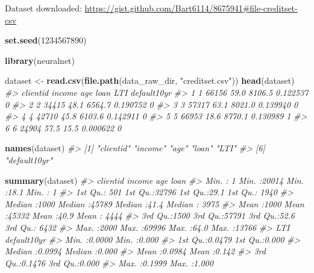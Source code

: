 \documentclass[]{book}
\newenvironment{Shaded}{\begin{snugshade}}{\end{snugshade}}
\newcommand{\CommentTok}[1]{\textcolor[rgb]{0.56,0.35,0.01}{\textit{#1}}}
\newcommand{\DecValTok}[1]{\textcolor[rgb]{0.00,0.00,0.81}{#1}}
\newcommand{\KeywordTok}[1]{\textcolor[rgb]{0.13,0.29,0.53}{\textbf{#1}}}
\newcommand{\NormalTok}[1]{#1}
\newcommand{\StringTok}[1]{\textcolor[rgb]{0.31,0.60,0.02}{#1}}
\begin{document}
Dataset downloaded: \url{https://gist.github.com/Bart6114/8675941\#file-creditset-csv}

\begin{Shaded}
\begin{Highlighting}[]
\KeywordTok{set.seed}\NormalTok{(}\DecValTok{1234567890}\NormalTok{)}

\KeywordTok{library}\NormalTok{(neuralnet)}

\NormalTok{dataset <-}\StringTok{ }\KeywordTok{read.csv}\NormalTok{(}\KeywordTok{file.path}\NormalTok{(data_raw_dir, }\StringTok{"creditset.csv"}\NormalTok{))}
\KeywordTok{head}\NormalTok{(dataset)}
\CommentTok{#>   clientid income  age   loan      LTI default10yr}
\CommentTok{#> 1        1  66156 59.0 8106.5 0.122537           0}
\CommentTok{#> 2        2  34415 48.1 6564.7 0.190752           0}
\CommentTok{#> 3        3  57317 63.1 8021.0 0.139940           0}
\CommentTok{#> 4        4  42710 45.8 6103.6 0.142911           0}
\CommentTok{#> 5        5  66953 18.6 8770.1 0.130989           1}
\CommentTok{#> 6        6  24904 57.5   15.5 0.000622           0}
\end{Highlighting}
\end{Shaded}

\begin{Shaded}
\begin{Highlighting}[]
\KeywordTok{names}\NormalTok{(dataset)}
\CommentTok{#> [1] "clientid"    "income"      "age"         "loan"        "LTI"        }
\CommentTok{#> [6] "default10yr"}
\end{Highlighting}
\end{Shaded}

\begin{Shaded}
\begin{Highlighting}[]
\KeywordTok{summary}\NormalTok{(dataset)}
\CommentTok{#>     clientid        income           age            loan      }
\CommentTok{#>  Min.   :   1   Min.   :20014   Min.   :18.1   Min.   :    1  }
\CommentTok{#>  1st Qu.: 501   1st Qu.:32796   1st Qu.:29.1   1st Qu.: 1940  }
\CommentTok{#>  Median :1000   Median :45789   Median :41.4   Median : 3975  }
\CommentTok{#>  Mean   :1000   Mean   :45332   Mean   :40.9   Mean   : 4444  }
\CommentTok{#>  3rd Qu.:1500   3rd Qu.:57791   3rd Qu.:52.6   3rd Qu.: 6432  }
\CommentTok{#>  Max.   :2000   Max.   :69996   Max.   :64.0   Max.   :13766  }
\CommentTok{#>       LTI          default10yr   }
\CommentTok{#>  Min.   :0.0000   Min.   :0.000  }
\CommentTok{#>  1st Qu.:0.0479   1st Qu.:0.000  }
\CommentTok{#>  Median :0.0994   Median :0.000  }
\CommentTok{#>  Mean   :0.0984   Mean   :0.142  }
\CommentTok{#>  3rd Qu.:0.1476   3rd Qu.:0.000  }
\CommentTok{#>  Max.   :0.1999   Max.   :1.000}
\end{Highlighting}
\end{Shaded}
\end{document}
